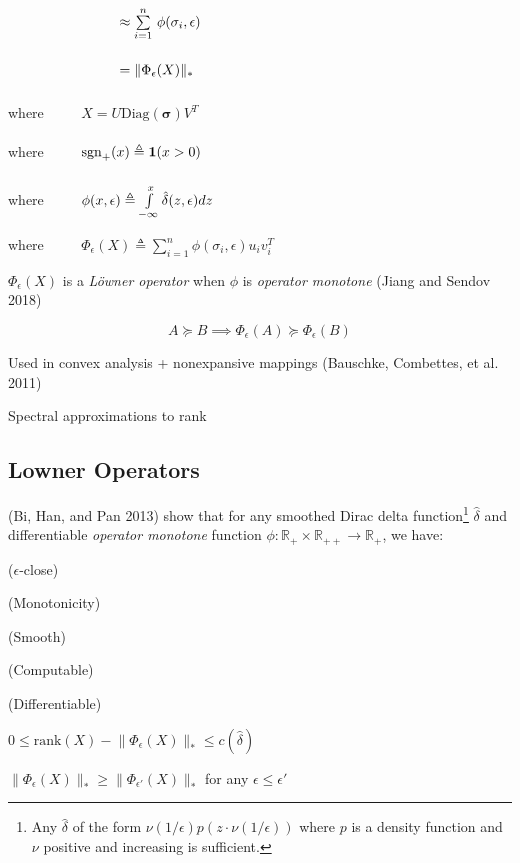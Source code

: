 \documentclass[
  letterpaper,
  DIV=11,
  numbers=noendperiod,
  oneside]{scrartcl}
\begin{document}
\(\quad\quad\quad\quad \hphantom{\mathrm{rank}(X)}\approx \sum\limits_{i=1}^n \, \phi(\sigma_i, \epsilon)\)

\(\quad\quad\quad\quad \hphantom{\mathrm{rank}(X)}=\lVert \Phi_\epsilon(X) \rVert_\ast \vphantom{\sum\limits_{i=1}^n}\)

where \(\quad\quad\) \(X = U \mathrm{Diag}(\mathbf{\sigma})V^T\)

where \(\quad\quad\)
\(\mathrm{sgn}_{+}(x) \triangleq \mathbf{1}(x > 0)\vphantom{\sum\limits_{i=1}^n}\)

where \(\quad\quad\)
\(\phi(x, \epsilon) \triangleq \int\limits_{-\infty}^x\hat{\delta}(z, \epsilon) dz\vphantom{\sum\limits_{i=1}^n}\)

where \(\quad\quad\)
\(\Phi_\epsilon(X) \triangleq \sum_{i=1}^n \phi(\sigma_i, \epsilon) u_i v_i^T\)

\(\Phi_\epsilon(X)\) is a \emph{Löwner operator} when \(\phi\) is
\emph{operator monotone} (Jiang and Sendov 2018)

\[ A \succeq B \implies \Phi_\epsilon(A) \succeq \Phi_\epsilon(B) \]

Used in convex analysis + nonexpansive mappings (Bauschke, Combettes, et
al. 2011)

Spectral approximations to rank

\hypertarget{lowner-operators}{%
\subsection{Lowner Operators}\label{lowner-operators}}

(Bi, Han, and Pan 2013) show that for any smoothed Dirac delta
function\footnote{Any \(\hat{\delta}\) of the form
  \(\nu(1/\epsilon) p (z \cdot \nu (1/\epsilon))\) where \(p\) is a
  density function and \(\nu\) positive and increasing is sufficient.}
\(\hat{\delta}\) and differentiable \emph{operator monotone} function
\(\phi: \mathbb{R}_+ \times \mathbb{R}_{++} \to \mathbb{R}_+\), we have:

(\(\epsilon\)-close)

(Monotonicity)

(Smooth)

(Computable)

(Differentiable)

\(0 \leq \mathrm{rank}(X) - \lVert \Phi_\epsilon(X) \rVert_\ast \leq c(\hat{\delta})\)

\(\lVert \Phi_{\epsilon}(X) \rVert_\ast \geq \lVert \Phi_{\epsilon'}(X) \rVert_\ast\)
for any \(\epsilon \leq \epsilon'\)
\end{document}
